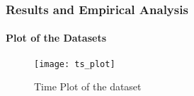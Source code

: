 \documentclass[12pt]{beamer}
\begin{document}
		\begin{frame}
			
						
		\frametitle{Results and Empirical Analysis}
		\framesubtitle{Plot of the Datasets}
		
		\begin{figure}[H]
		\centering
		\texttt{[image: ts\_plot]}  %
		\caption{Time Plot of the dataset}
		\label{fig:ts_plot}
	\end{figure}
		
	\end{frame}
	
	
	
\end{document}
